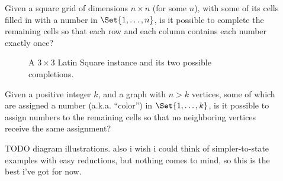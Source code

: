 \begin{description}

\item[] Given a square grid of dimensions \(n×n\) (for
  some \(n\)), with some of its cells filled in with a number in
  \(\Set{1,\dotsc,n}\), is it possible to complete the remaining cells so that
  each row and each column contains each number exactly once?

  \begin{figure}[H]
    \begin{center}

      \caption{A \(3×3\) Latin Square instance and its two possible
      completions.}

      \label{fig:background.latin-square-example}

    \end{center}
  \end{figure}

\item[] Given a positive integer \(k\), and a graph
  with \(n>k\) vertices, some of which are assigned a number (a.k.a. ``color'')
  in \(\Set{1,\dotsc,k}\), is it possible to assign numbers to the remaining
  cells so that no neighboring vertices receive the same assignment?

  \begin{figure}[H]
    \begin{center}
      \begin{tikzpicture}


      \end{tikzpicture}
    \end{center}
  \end{figure}


  TODO diagram illustrations.  also i wish i could think of simpler-to-state
  examples with easy reductions, but nothing comes to mind, so this is the best
  i've got for now.

\end{description}

